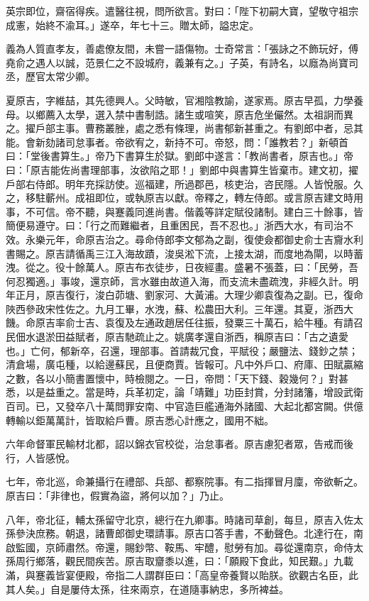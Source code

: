 \begin{pinyinscope}
英宗即位，齋宿得疾。遣醫往視，問所欲言。對曰：「陛下初嗣大寶，望敬守祖宗成憲，始終不渝耳。」遂卒，年七十三。贈太師，謚忠定。

義為人質直孝友，善處僚友間，未嘗一語傷物。士奇常言：「張詠之不飾玩好，傅堯俞之遇人以誠，范景仁之不設城府，義兼有之。」子英，有詩名，以廕為尚寶司丞，歷官太常少卿。

夏原吉，字維喆，其先德興人。父時敏，官湘陰教諭，遂家焉。原吉早孤，力學養母。以鄉薦入太學，選入禁中書制誥。諸生或喧笑，原吉危坐儼然。太祖詗而異之。擢戶部主事。曹務叢脞，處之悉有條理，尚書郁新甚重之。有劉郎中者，忌其能。會新劾諸司怠事者。帝欲宥之，新持不可。帝怒，問：「誰教若？」新頓首曰：「堂後書算生。」帝乃下書算生於獄。劉郎中遂言：「教尚書者，原吉也。」帝曰：「原吉能佐尚書理部事，汝欲陷之耶！」劉郎中與書算生皆棄市。建文初，擢戶部右侍郎。明年充採訪使。巡福建，所過郡邑，核吏治，咨民隱。人皆悅服。久之，移駐蘄州。成祖即位，或執原吉以獻。帝釋之，轉左侍郎。或言原吉建文時用事，不可信。帝不聽，與蹇義同進尚書。偕義等詳定賦役諸制。建白三十餘事，皆簡便易遵守。曰：「行之而難繼者，且重困民，吾不忍也。」浙西大水，有司治不效。永樂元年，命原吉治之。尋命侍郎李文郁為之副，復使僉都御史俞士吉齎水利書賜之。原吉請循禹三江入海故蹟，浚吳淞下流，上接太湖，而度地為閘，以時蓄洩。從之。役十餘萬人。原吉布衣徒步，日夜經畫。盛暑不張蓋，曰：「民勞，吾何忍獨適。」事竣，還京師，言水雖由故道入海，而支流未盡疏洩，非經久計。明年正月，原吉復行，浚白茆塘、劉家河、大黃浦。大理少卿袁復為之副。已，復命陜西參政宋性佐之。九月工畢，水洩，蘇、松農田大利。三年還。其夏，浙西大饑。命原吉率俞士吉、袁復及左通政趙居任往振，發粟三十萬石，給牛種。有請召民佃水退淤田益賦者，原吉馳疏止之。姚廣孝還自浙西，稱原吉曰：「古之遺愛也。」亡何，郁新卒，召還，理部事。首請裁冗食，平賦役；嚴鹽法、錢鈔之禁；清倉場，廣屯種，以給邊蘇民，且便商賈。皆報可。凡中外戶口、府庫、田賦贏縮之數，各以小簡書置懷中，時檢閱之。一日，帝問：「天下錢、穀幾何？」對甚悉，以是益重之。當是時，兵革初定，論「靖難」功臣封賞，分封諸籓，增設武衛百司。已，又發卒八十萬問罪安南、中官造巨艦通海外諸國、大起北都宮闕。供億轉輸以鉅萬萬計，皆取給戶曹。原吉悉心計應之，國用不絀。

六年命督軍民輸材北都，詔以錦衣官校從，治怠事者。原吉慮犯者眾，告戒而後行，人皆感悅。

七年，帝北巡，命兼攝行在禮部、兵部、都察院事。有二指揮冒月廩，帝欲斬之。原吉曰：「非律也，假實為盜，將何以加？」乃止。

八年，帝北征，輔太孫留守北京，總行在九卿事。時諸司草創，每旦，原吉入佐太孫參決庶務。朝退，諸曹郎御史環請事。原吉口答手書，不動聲色。北達行在，南啟監國，京師肅然。帝還，賜鈔幣、鞍馬、牢醴，慰勞有加。尋從還南京，命侍太孫周行鄉落，觀民間疾苦。原吉取齏黍以進，曰：「願殿下食此，知民艱。」九載滿，與蹇義皆宴便殿，帝指二人謂群臣曰：「高皇帝養賢以貽朕。欲觀古名臣，此其人矣。」自是屢侍太孫，往來兩京，在道隨事納忠，多所裨益。


\end{pinyinscope}
